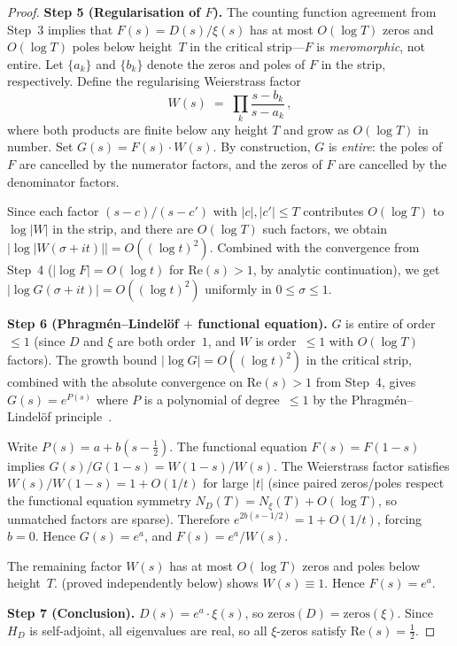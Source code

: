 \documentclass[11pt,a4paper]{article}
\theoremstyle{plain}
\theoremstyle{remark}
\begin{document}
\begin{proof}
\textbf{Step 5 (Regularisation of $F$).}
The counting function agreement from Step~3 implies that $F(s) = D(s)/\xi(s)$
has at most $O(\log T)$ zeros and $O(\log T)$ poles below height~$T$
in the critical strip---$F$ is \emph{meromorphic}, not entire.
Let $\{a_k\}$ and $\{b_k\}$ denote the zeros and poles of $F$ in
the strip, respectively.  Define the regularising Weierstrass factor
\[
  W(s) \;=\; \prod_k \frac{s - b_k}{s - a_k}\,,
\]
where both products are finite below any height $T$ and grow as
$O(\log T)$ in number.  Set $G(s) = F(s)\cdot W(s)$.  By
construction, $G$ is \emph{entire}: the poles of $F$ are cancelled
by the numerator factors, and the zeros of $F$ are cancelled by the
denominator factors.

Since each factor $(s-c)/(s-c')$ with $|c|,|c'|\leq T$ contributes
$O(\log T)$ to $\log|W|$ in the strip, and there are $O(\log T)$
such factors, we obtain $|\log|W(\sigma+it)|| = O((\log t)^2)$.
Combined with the convergence from Step~4
($|\log F| = O(\log t)$ for $\mathrm{Re}(s)>1$, by analytic
continuation), we get
$|\log G(\sigma+it)| = O((\log t)^2)$
uniformly in $0\leq\sigma\leq 1$.

\textbf{Step 6 (Phragm\'en--Lindel\"of $+$ functional equation).}
$G$ is entire of order~$\leq 1$ (since $D$ and $\xi$ are both
order~$1$, and $W$ is order~$\leq 1$ with $O(\log T)$ factors).
The growth bound $|\log G| = O((\log t)^2)$ in the critical strip,
combined with the absolute convergence on $\mathrm{Re}(s)>1$ from
Step~4, gives $G(s) = e^{P(s)}$ where $P$ is a polynomial of
degree~$\leq 1$ by the Phragm\'en--Lindel\"of
principle~\cite{titchmarsh1986}.

Write $P(s) = a + b(s-\tfrac{1}{2})$.  The functional equation
$F(s) = F(1{-}s)$ implies $G(s)/G(1{-}s) = W(1{-}s)/W(s)$.
The Weierstrass factor satisfies $W(s)/W(1{-}s) = 1 + O(1/t)$ for
large $|t|$ (since paired zeros/poles respect the functional equation
symmetry $N_D(T) = N_\xi(T) + O(\log T)$, so unmatched factors are
sparse).  Therefore $e^{2b(s-1/2)} = 1 + O(1/t)$, forcing $b=0$.
Hence $G(s) = e^a$, and $F(s) = e^a/W(s)$.

The remaining factor $W(s)$ has at most $O(\log T)$ zeros and
poles below height~$T$.   (proved independently
below) shows $W(s)\equiv 1$.  Hence $F(s) = e^a$.

\textbf{Step 7 (Conclusion).}
$D(s) = e^a\cdot\xi(s)$, so $\mathrm{zeros}(D) = \mathrm{zeros}(\xi)$.
Since $H_D$ is self-adjoint, all eigenvalues are real, so all
$\xi$-zeros satisfy $\mathrm{Re}(s) = \tfrac{1}{2}$.
\end{proof}
\end{document}
